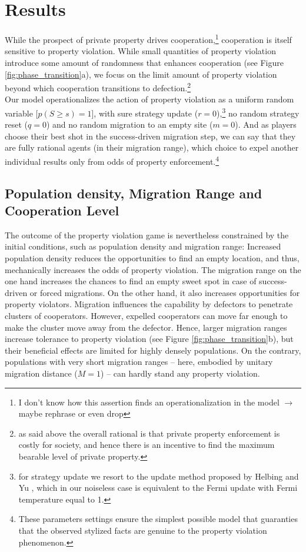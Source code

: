 \section*{Results}
While the prospect of private property drives cooperation,\footnote{I don't know how this assertion finds an operationalization in the model $\rightarrow$ maybe rephrase or even drop} cooperation is itself sensitive to property violation. While small quantities of property violation introduce some amount of randomness that enhances cooperation (see Figure \ref{fig:phase_transition}a), we focus on the limit amount of property violation beyond which cooperation transitions to defection.\footnote{as said above the overall rational is that private property enforcement is costly for society, and hence there is an incentive to find the maximum bearable level of private property.}\\

Our model operationalizes the action of property violation as a uniform random variable [$p(S \geqslant s) = 1$], with sure strategy update ($r=0$),\footnote{for strategy update we resort to the update method proposed by Helbing and Yu \cite{helbing2009outbreak}, which in our noiseless case is equivalent to the Fermi update with Fermi temperature equal to 1.} no random strategy reset ($q=0$) and no random migration to an empty site ($m=0$). And as players choose their best shot in the success-driven migration step, we can say that they are fully rational agents (in their migration range), which choice to expel another individual results only from odds of property enforcement.\footnote{These parameters settings ensure the simplest possible model that guaranties that the observed stylized facts are genuine to the property violation phenomenon.} \\

\subsection*{Population density, Migration Range and Cooperation Level} 
The outcome of the property violation game is nevertheless constrained by the initial conditions, such as population density and migration range: Increased population density reduces the opportunities to find an empty location, and thus, mechanically increases the odds of property violation. The migration range on the one hand increases the chances to find an empty sweet spot in case of success-driven  or forced migrations. On the other hand, it also increases opportunities for property violators. Migration influences the capability by defectors to penetrate clusters of cooperators. However, expelled cooperators can move far enough to make the cluster move away from the defector. Hence, larger migration ranges increase tolerance to property violation (see Figure \ref{fig:phase_transition}b), but their beneficial effects are limited for highly densely populations. On the contrary, populations with very short migration ranges -- here, embodied by unitary migration distance ($M=1$) -- can hardly stand any property violation. 

